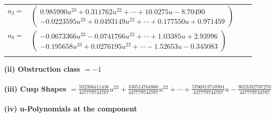 \documentclass[1p]{elsarticle_modified}
\theoremstyle{definition}
\begin{document}
\begin{tabular}{m{7pt} m{180pt} m{7pt} m{180pt} }
\flushright $a_{2}=$&$\begin{pmatrix}0.985990 u^{23}+0.311762 u^{22}+\cdots+10.0275 u-8.70490\\-0.0223595 u^{23}+0.0493149 u^{22}+\cdots+0.177550 u+0.971459\end{pmatrix}$ \\
\flushright $a_{8}=$&$\begin{pmatrix}-0.0673366 u^{23}-0.0741766 u^{22}+\cdots+1.03385 u+2.93996\\-0.195658 u^{23}+0.0276195 u^{22}+\cdots-1.52653 u-0.345083\end{pmatrix}$\\&\end{tabular}
\flushleft \textbf{(ii) Obstruction class $= -1$}\\~\\
\flushleft \textbf{(iii) Cusp Shapes $= \frac{592306411436}{447779744787} u^{23}+\frac{330514764860}{447779744787} u^{22}+\cdots+\frac{5706913716904}{447779744787} u-\frac{8023392787270}{447779744787}$}\\~\\
\newpage\renewcommand{\arraystretch}{1}
\flushleft \textbf{(iv) u-Polynomials at the component}\newline \\
\end{document}
